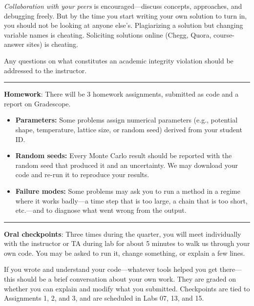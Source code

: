\documentclass[12pt]{article}
\begin{document}
\vspace{2mm}
\noindent\emph{Collaboration with your peers} is encouraged---discuss concepts, approaches, and debugging freely.
But by the time you start writing your own solution to turn in, you should not be looking at anyone else's.
Plagiarizing a solution but changing variable names is cheating.
Soliciting solutions online (Chegg, Quora, course-answer sites) is cheating.

\vspace{2mm}
\noindent Any questions on what constitutes an academic integrity violation should be addressed to the instructor.

\begin{center}
  \rule{\textwidth}{0.5pt}
\end{center}

\noindent\textbf{Homework}: There will be 3 homework assignments, submitted as code and a report on Gradescope.

\begin{itemize}
  \itemsep-0.3em
  \item \textbf{Parameters:} Some problems assign numerical parameters (e.g., potential shape, temperature, lattice size, or random seed) derived from your student ID.
  \item \textbf{Random seeds:} Every Monte Carlo result should be reported with the random seed that produced it and an uncertainty. We may download your code and re-run it to reproduce your results.
  \item \textbf{Failure modes:} Some problems may ask you to run a method in a regime where it works badly---a time step that is too large, a chain that is too short, etc.---and to diagnose what went wrong from the output.
\end{itemize}

\begin{center}
  \rule{\textwidth}{0.5pt}
\end{center}

\noindent\textbf{Oral checkpoints}: Three times during the quarter, you will meet individually with the instructor or TA during lab for about 5 minutes to walk us through your own code.
You may be asked to run it, change something, or explain a few lines.

If you wrote and understand your code---whatever tools helped you get there---this should be a brief conversation about your own work.
They are graded on whether you can explain and modify what you submitted.
Checkpoints are tied to Assignments 1, 2, and 3, and are scheduled in Labs 07, 13, and 15.
\end{document}

